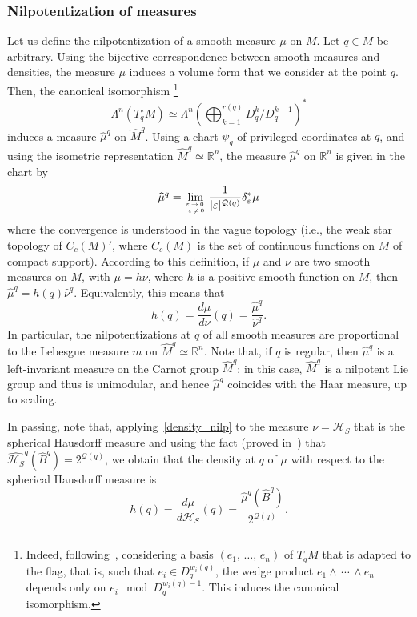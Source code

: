 \documentclass[10pt]{amsart}
\theoremstyle{definition}\newtheorem{defi}[theo]{Definition}\newtheorem{rema}[theo]{Remark}\newtheorem{exam}[theo]{Example}\newtheorem{exem}[theo]{Example}\newtheorem{nota}[theo]{Notation}
\newcommand*\R{\mathbb{R}}
\newcommand{\calQ}{\mathcal{Q}}
\newcommand{\calH}{\mathcal{H}}
\begin{document}
\subsubsection{Nilpotentization of measures}
Let us define the nilpotentization of a smooth measure $\mu$ on $M$. Let $q\in M$ be arbitrary. Using the bijective correspondence between smooth measures and densities, the measure $\mu$ induces a volume form that we consider at the point $q$. Then, the canonical isomorphism
\footnote{Indeed, following~\cite{ABGR}, considering a basis $(e_1,\,\ldots,\,e_n)$ of $T_{q}M$ that is adapted to the flag, that is, such that $e_i\in D_{q}^{w_i(q)}$, the wedge product $e_1\wedge\,\cdots\,\wedge e_n$ depends only on $e_i\mod D_{q}^{w_i(q)-1}$. This induces the canonical isomorphism.}
\[
\Lambda^n\left(T^\star_{q} M\right) \simeq \Lambda^n\left(\bigoplus_{k=1}^{r(q)} D_{q}^k/D_{q}^{k-1} \right)^*
\]
induces a measure $\widehat{\mu}^{q}$ on $\widehat{M}^{q}$. Using a chart $\psi_{q}$ of privileged coordinates at $q$, and using the isometric representation $\widehat{M}^{q}\simeq\R^n$, the measure $\widehat{\mu}^{q}$ on $\R^n$ is given in the chart by
\[
\widehat{\mu}^{q} = \lim_{\varepsilon\,\rightarrow\,0\,\atop \,\varepsilon\,\neq\,0} \frac{1}{\vert\varepsilon\vert^{\calQ(q)}} \delta_\varepsilon^* \mu
\]
where the convergence is understood in the vague topology (i.e., the weak star topology of $C_c(M)'$, where $C_c(M)$ is the set of continuous functions on $M$ of compact support). According to this definition, if $\mu$ and $\nu$ are two smooth measures on $M$, with $\mu=h\nu$, where $h$ is a positive smooth function on $M$, then $\widehat{\mu}^{q}=h(q)\widehat{\nu}^{q}$. Equivalently, this means that
\begin{equation}\label{density_nilp}
h(q) = \frac{d\mu}{d\nu}(q) = \frac{\widehat{\mu}^{q}}{\widehat{\nu}^{q}}.
\end{equation}
In particular, the nilpotentizations at $q$ of all smooth measures are proportional to the Lebesgue measure $m$ on $\widehat{M}^{q}\simeq\R^n$. Note that, if $q$ is regular, then $\widehat{\mu}^{q}$ is a left-invariant measure on the Carnot group $\widehat{M}^{q}$; in this case, $\widehat{M}^{q}$ is a nilpotent Lie group and thus is unimodular, and hence $\widehat{\mu}^{q}$ coincides with the Haar measure, up to scaling.


In passing, note that, applying~\eqref{density_nilp} to the measure $\nu=\calH_S$ that is the spherical Hausdorff measure and using the fact (proved in~\cite{AgrachevBarilariBoscain_CV2012}) that $\widehat{\calH_S}^{q}(\widehat{B}^{q})=2^{\calQ(q)}$, we obtain that the density at $q$ of $\mu$ with respect to the spherical Hausdorff measure is
\[
h(q) = \frac{d\mu}{d\calH_S}(q) = \frac{\widehat{\mu}^{q}\left(\widehat{B}^{q}\right)}{2^{\calQ(q)}}.
\]
\end{document}
